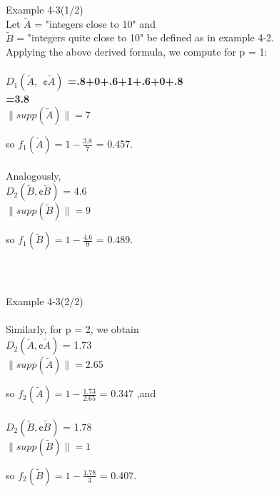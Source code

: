 \documentclass{beamer}
\begin{document}
\begin{CJK*}{UTF8}{bsmi}
\begin{frame}
\begin{block}{Example 4-3(1/2)}
~\\
Let $\tilde{A}$ = "integers close to 10" and\\
$\tilde{B}$ = "integers quite close to 10" be defined as in {\color{red}example 4-2.}\\
Applying the above derived formula, we compute for p = 1:\\
~\\
\centering\textbf{$D_{1}(\tilde{A},~~¢\tilde{A})$ =.8+0+.6+1+.6+0+.8}\\
\textbf{=3.8}\\
\centering\textbf{$\|supp(\tilde{A})\| = 7$}\\
\raggedright so $f_{1}(\tilde{A}) = 1 - \frac{3.8}{7}$ = {\color{red}0.457.}\\
~\\
Analogously,\\
\centering $D_{2}(\tilde{B},\textbf{¢}\tilde{B})$ = 4.6\\
\centering\textbf{$\|supp(\tilde{B})\| = 9$}\\
\raggedright so $f_{1}(\tilde{B}) = 1 - \frac{4.6}{9}$ = {\color{red}0.489.}\\
~\\
~\\
\end{block}

\end{frame}


\begin{frame}
\frametitle{}

\begin{block}{Example 4-3(2/2)}
~\\
~\\
Similarly, for p = 2, we obtain\\
\centering $D_{2}(\tilde{A},\textbf{¢}\tilde{A})$ = 1.73\\
\centering\textbf{$\|supp(\tilde{A})\| = 2.65$}\\
\raggedright so $f_{2}(\tilde{A}) = 1 - \frac{1.73}{2.65}$ = {\color{red}0.347} ,and\\
~\\
\centering $D_{2}(\tilde{B},\textbf{¢}\tilde{B})$ = 1.78\\
\centering\textbf{$\|supp(\tilde{B})\| = 1$}\\
\raggedright so $f_{2}(\tilde{B}) = 1 - \frac{1.78}{3}$ = {\color{red}0.407.}\\
~\\
~\\
\end{block}


\end{frame}
\end{CJK*}
\end{document}
